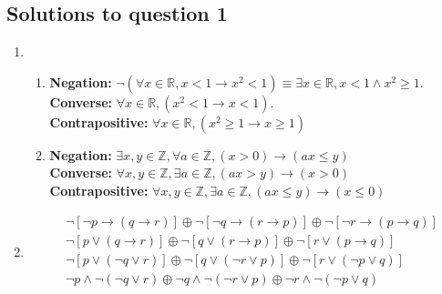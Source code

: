 \documentclass{article}
\begin{document}
\subsection*{Solutions to question 1}

\begin{enumerate}[label=(\alph*)]
    \item \begin{enumerate}[label=\roman*.]
              \item \textbf{Negation: } $\neg(\forall x \in \mathbb{R}, x < 1 \rightarrow x^2 < 1) \equiv \exists x \in \mathbb{R}, x < 1 \land x^2 \ge 1$.\\
                    \textbf{Converse: } $\forall x \in \mathbb{R}, (x^2 < 1 \rightarrow x < 1)$.\\
                    \textbf{Contrapositive: } $\forall x \in \mathbb{R}, (x^2 \ge 1 \rightarrow x \ge 1)$
              \item \textbf{Negation: } $\exists x, y \in \mathbb{Z}, \forall a \in \mathbb{Z}, (x > 0) \rightarrow (ax \leq y)$\\
                    \textbf{Converse: } $\forall x, y \in \mathbb{Z}, \exists a \in \mathbb{Z}, (ax > y) \rightarrow (x > 0)$\\
                    \textbf{Contrapositive: } $\forall x, y \in \mathbb{Z}, \exists a \in \mathbb{Z}, (ax \leq y) \rightarrow (x \leq 0)$\\
          \end{enumerate}
    \item \begin{align*}
               & \neg[\neg p \rightarrow (q \rightarrow r)] \oplus \neg[\neg q \rightarrow (r \rightarrow p)] \oplus \neg[\neg r \rightarrow (p \rightarrow q)]                                     \\
               & \neg[ p \lor (q \rightarrow r)] \oplus \neg[ q \lor (r \rightarrow p)] \oplus \neg[ r \lor (p \rightarrow q)]                                                                      \\
               & \neg[ p \lor (\neg q \lor r)] \oplus \neg[ q \lor (\neg r \lor p)] \oplus \neg[ r \lor (\neg p \lor q)]                                                                            \\
               & \neg p \land \neg (\neg q \lor r) \oplus  \neg q \land \neg (\neg r \lor p) \oplus  \neg r \land \neg (\neg p \lor q)                                                              \\

\end{align*}
\end{enumerate}
\end{document}
